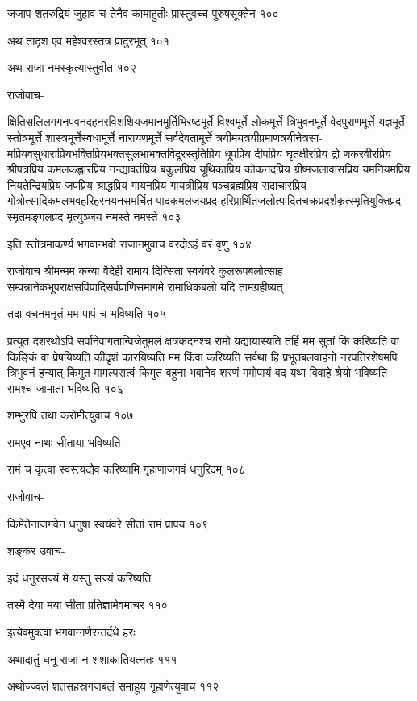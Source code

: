 जजाप शतरुद्रियं जुहाव च तेनैव कामाहुतीः प्रास्तुवच्च पुरुषसूक्तेन १००

अथ तादृश एव महेश्वरस्तत्र प्रादुरभूत् १०१

अथ राजा नमस्कृत्यास्तुवीत १०२

राजोवाच-

क्षितिसलिलगगनपवनदहनरविशशियजमानमूर्तिभिरष्टमूर्ते विश्वमूर्ते लोकमूर्त्ते त्रिभुवनमूर्ते
वेदपुराणमूर्त्ते यज्ञमूर्ते स्तोत्रमूर्त्ते शास्त्रमूर्त्तेस्वधामूर्त्ते नारायणमूर्त्ते सर्वदेवतामूर्त्ते
त्रयीमयत्रयीप्रमाणत्रयीनेत्रसा-मप्रियवसुधाराप्रियभक्तिप्रियभक्तसुलभाभक्तविदूरस्तुतिप्रिय
धूपप्रिय दीपप्रिय घृतक्षीरप्रिय द्रो णकरवीरप्रिय श्रीपत्रप्रिय कमलकह्लारप्रिय
नन्द्यावर्तप्रिय बकुलप्रिय यूथिकाप्रिय कोकनदप्रिय ग्रीष्मजलावासप्रिय यमनियमप्रिय
नियतेन्द्रियप्रिय जपप्रिय श्राद्धप्रिय गायनप्रिय गायत्रीप्रिय पञ्चब्रह्मप्रिय सदाचारप्रिय
गोत्रोत्सादिकमलभवहरिहरनयनसमर्चित पादकमलजयप्रद
हरिप्रार्थितजलोत्पादितचक्रप्रदर्शकृत्स्मृतियुक्तिप्रद स्मृतमङ्गलप्रद मृत्युञ्जय नमस्ते नमस्ते १०३

इति स्तोत्रमाकर्ण्य भगवान्भवो राजानमुवाच वरदोऽहं वरं वृणु १०४

राजोवाच श्रीमन्मम कन्या वैदेही रामाय दित्सिता स्वयंवरे कुलरूपबलोत्साह
सम्पन्नानेकभूपराक्षसविप्रादिसर्वप्राणिसमागमे रामाधिकबलो यदि तामग्रहीष्यत्

तदा वचनमनृतं मम पापं च भविष्यति १०५

प्रत्युत दशरथोऽपि सर्वानेवागतान्विजेतुमलं क्षत्रकदनश्च रामो यद्यायास्यति तर्हि मम सुतां
किं करिष्यति वा किङ्किं वा प्रेषयिष्यति कीदृशं कारयिष्यति मम किंवा करिष्यति सर्वथा हि
प्रभूतबलवाहनो नरपतिरशेषमपि त्रिभुवनं हन्यात् किमुत मामल्पसत्वं किमुत बहुना भवानेव शरणं
ममोपायं वद यथा विवाहे श्रेयो भविष्यति रामश्च जामाता भविष्यति १०६

शम्भुरपि तथा करोमीत्युवाच १०७

रामएव नाथः सीताया भविष्यति

रामं च कृत्वा स्वस्त्यद्यैव करिष्यामि गृहाणाजगवं धनुरिदम् १०८

राजोवाच-

किमेतेनाजगवेन धनुषा स्वयंवरे सीतां रामं प्रापय १०९

शङ्कर उवाच-

इदं धनुरसज्यं मे यस्तु सज्यं करिष्यति

तस्मै देया मया सीता प्रतिज्ञामेवमाचर ११०

इत्येवमुक्त्वा भगवान्गणैरन्तर्दधे हरः

अथादातुं धनू राजा न शशाकातियत्नतः १११

अथोज्ज्वलं शतसहस्रगजबलं समाहूय गृहाणेत्युवाच ११२

